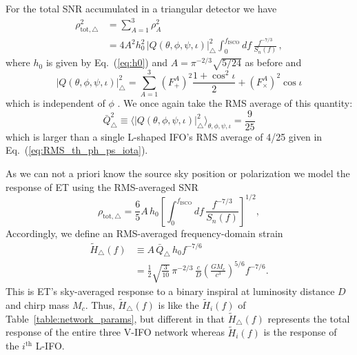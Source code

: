 \documentclass[prd,amsmath,amssymb,aps,floats,amsfonts,notitlepage,superscriptaddress,eqsecnum,nofootinbib,10pt]{revtex4-1}
\newcommand{\nn}{\nonumber}
\newcommand{\f}{\frac}
\newcommand{\be}{\begin{equation}}
\newcommand{\ee}{\end{equation}}
\begin{document}
For the total SNR accumulated in a triangular detector we have
%
\begin{align}
\rho^2_{\text{tot},\bigtriangleup} & = \sum_{A=1}^3 \rho_A^2 \nn \\ %
 & =  4 A^2 h_0^2\,|Q(\theta,\phi,\psi,\iota)|_\bigtriangleup^2 \int_0^{f_\text{ISCO}} d f\, \f{f^{-7/3}}{S_n(f)} \, ,\label{eq:ET_SNRsq}
\end{align}
where $h_0$ is given by Eq.~(\ref{eq:h0}) and $A=\pi^{-2/3}\sqrt{5/24}$ as before and
%
\be
|Q(\theta,\phi,\psi,\iota)|_\bigtriangleup^2 = \sum_{A=1}^3 \left(F^A_+\right)^2\f{1+\cos^2\iota}{2}  + \left(F^A_\times\right)^2 \cos\iota \label{eq:Q_sq_ET}
\ee
%
which is independent of $\phi$ \cite{Regimbau:2012ir}. We once again take the RMS average of this quantity:
%
\be
\bar{Q}^2_\bigtriangleup\equiv\langle |Q(\theta,\phi,\psi,\iota)|_\bigtriangleup^2 \rangle_{\theta,\phi,\psi,\iota} = \f{9}{25}\label{eq:RMS_ET}
\ee
%
which is larger than a single L-shaped IFO's RMS average of 4/25 given in Eq.~(\ref{eq:RMS_th_ph_ps_iota}).

As we can not a priori know the source sky position or polarization we model the response of ET using the RMS-averaged SNR %
%
\be
\rho_{\text{tot},\bigtriangleup} = \f{6}{5}A\, h_0 \left[\int_0^{f_\text{ISCO}} d f\, \f{f^{-7/3}}{S_n(f)}\right]^{1/2} \label{eq:ET_SNR},
\ee
Accordingly, we define an RMS-averaged frequency-domain strain
%
\begin{align}
\tilde{H}_\bigtriangleup(f)&\equiv A\,  \bar{Q}_\bigtriangleup\, h_0 f^{-7/6} \nn \\
   & = \f{1}{2}\sqrt{\f{3}{10}}\,{\pi^{-2/3}}\, \f{c}{D}\left(\f{G M_c}{c^3}\right)^{5/6} f^{-7/6}. \label{eq:H_delta}
\end{align}
%
This is ET's sky-averaged response to a binary inspiral at luminosity distance $D$ and chirp mass $M_c$.
Thus, $\tilde{H}_\bigtriangleup(f)$ is like the $\tilde{H}_i(f)$ of Table~\ref{table:network_params},
but different in that  $\tilde{H}_\bigtriangleup(f)$ represents the total response of the entire three V-IFO network whereas $\tilde{H}_i(f)$
is the response of the $i^\text{th}$ L-IFO.
\end{document}
